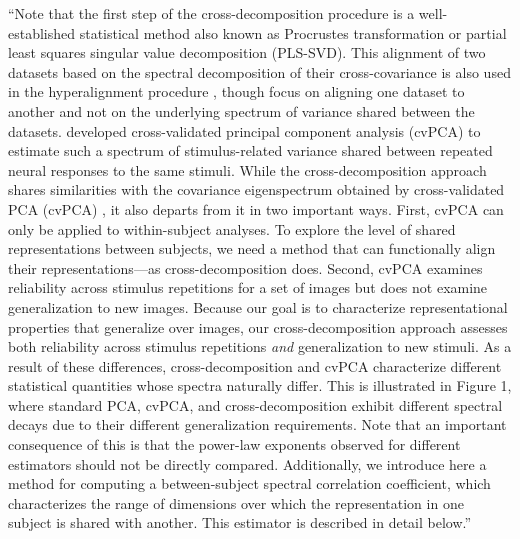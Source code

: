 \documentclass[10pt]{article}
\begin{document}
``Note that the first step of the cross-decomposition procedure is a well-established statistical method also known as Procrustes transformation or partial least squares singular value decomposition (PLS-SVD). This alignment of two datasets based on the spectral decomposition of their cross-covariance is also used in the hyperalignment procedure \autocite{Haxby2011}, though \textcite{Haxby2011} focus on aligning one dataset to another and not on the underlying spectrum of variance shared between the datasets. \textcite{Stringer2019} developed cross-validated principal component analysis (cvPCA) to estimate such a spectrum of stimulus-related variance shared between repeated neural responses to the same stimuli. While the cross-decomposition approach shares similarities with the covariance eigenspectrum obtained by cross-validated PCA (cvPCA) \autocite{Stringer2019}, it also departs from it in two important ways. First, cvPCA can only be applied to within-subject analyses. To explore the level of shared representations between subjects, we need a method that can functionally align their representations---as cross-decomposition does. Second, cvPCA examines reliability across stimulus repetitions for a set of images but does not examine generalization to new images. Because our goal is to characterize representational properties that generalize over images, our cross-decomposition approach assesses both reliability across stimulus repetitions \emph{and} generalization to new stimuli. As a result of these differences, cross-decomposition and cvPCA characterize different statistical quantities whose spectra naturally differ. This is illustrated in Figure 1, where standard PCA, cvPCA, and cross-decomposition exhibit different spectral decays due to their different generalization requirements. Note that an important consequence of this is that the power-law exponents observed for different estimators should not be directly compared. Additionally, we introduce here a method for computing a between-subject spectral correlation coefficient, which characterizes the range of dimensions over which the representation in one subject is shared with another. This estimator is described in detail below.''

\newpage
\printbibliography
\end{document}
